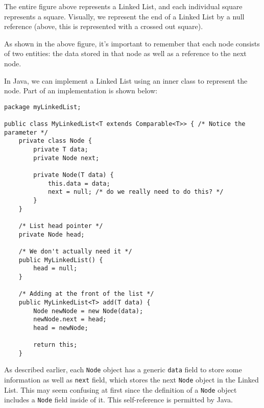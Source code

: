 The entire figure above represents a Linked List, and each individual square represents a square. Visually, we represent the end of a Linked List by a null reference (above, this is represented with a crossed out square).  

As shown in the above figure, it's important to remember that each node consists of two entities: the data stored in that node as well as a reference to the next node. 

In Java, we can implement a Linked List using an inner class to represent the node. Part of an implementation is shown below:

\begin{lstlisting}
package myLinkedList;

public class MyLinkedList<T extends Comparable<T>> { /* Notice the parameter */
	private class Node {
		private T data;
		private Node next;

		private Node(T data) {
			this.data = data;
			next = null; /* do we really need to do this? */
		}
	}

	/* List head pointer */
	private Node head;

	/* We don't actually need it */
	public MyLinkedList() {
		head = null;
	}

	/* Adding at the front of the list */
	public MyLinkedList<T> add(T data) {
		Node newNode = new Node(data);
		newNode.next = head;
		head = newNode;

		return this;
	}
\end{lstlisting}

As described earlier, each \verb!Node! object has a generic \verb!data! field to store some information as well as \verb!next! field, which stores the next \verb!Node! object in the Linked List. This may seem confusing at first since the definition of a \verb!Node! object includes a \verb!Node! field inside of it. This self-reference is permitted by Java. 